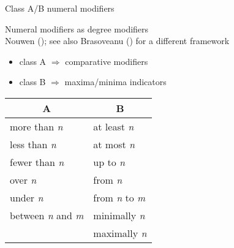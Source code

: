 \documentclass[12pt]{beamer}
\begin{document}
\begin{frame}{Class A/B numeral modifiers}

Numeral modifiers as degree modifiers\\
\scriptsize Nouwen (\citeyear{nouwen2010two}); see also Brasoveanu (\citeyear{brasoveanu2012modified}) for a different framework\normalsize

\begin{itemize}
\item class A $\Rightarrow$ comparative modifiers
\item class B $\Rightarrow$ maxima/minima indicators%
\end{itemize}

\begin{table}[]
\centering
\label{table:class-AB}
\begin{tabular}{@{}ll@{}}
\toprule
\multicolumn{1}{c}{A}    & \multicolumn{1}{c}{B}\\ \midrule
more than \textit{n}     & at least \textit{n}  \\
less than \textit{n}     & at most \textit{n}   \\
fewer than \textit{n}    & up to \textit{n}     \\
over \textit{n}          & from \textit{n}      \\
under \textit{n}         & from \textit{n} to \textit{m} \\
between \textit{n} and \textit{m} & minimally \textit{n} \\
                & maximally \textit{n} \\ \bottomrule
\end{tabular}
\end{table}



\end{frame}
\end{document}
